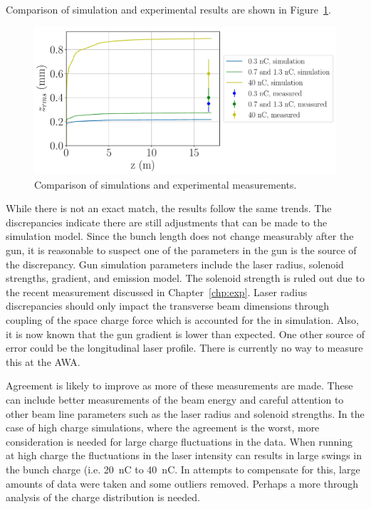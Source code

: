 Comparison of simulation and experimental results are shown in Figure~\ref{sims}.
\begin{figure}%
	\centering
	\includegraphics[width=0.75\linewidth]{images/THPMF048f5}
	\caption{Comparison of simulations and experimental measurements.}
	\label{sims}
\end{figure}
While there is not an exact match, the results follow the same trends.
The discrepancies indicate there are still adjustments that can be made
to the simulation model. Since the bunch length does not change measurably 
after the gun, it is reasonable to suspect one of the parameters in the 
gun is the source of the discrepancy. Gun simulation parameters include the laser radius, 
solenoid strengths, gradient, and emission model. The solenoid strength is ruled 
out due to the recent measurement discussed in Chapter~\ref{chp:exp}. 
Laser radius discrepancies should only impact the transverse beam dimensions 
through coupling of the space charge force which is accounted for the in simulation. 
Also, it is now known that the gun gradient is lower than expected.
One other source of error could be the longitudinal laser profile.
There is currently no way to measure this at the AWA. 

Agreement is likely to improve as more of these measurements are made. 
These can include better measurements of the beam energy and careful attention to other 
beam line parameters such as the laser radius and solenoid strengths.
In the case of high charge simulations, where the agreement is the worst, 
more consideration is needed for large charge fluctuations in the data.
When running at high charge the fluctuations in the laser intensity can results in 
large swings in the bunch charge (i.e. \SI{20}{nC} to \SI{40}{nC}. 
In attempts to compensate for this, large amounts of data were taken and some 
outliers removed. Perhaps a more through analysis of the charge distribution is needed. 

